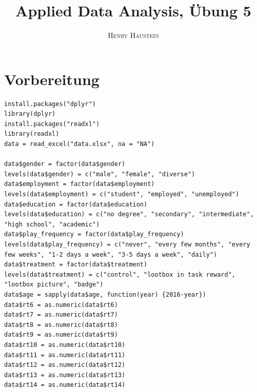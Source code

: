 \documentclass{article}
\title{\textbf{Applied Data Analysis, Übung 5}}
\author{\textsc{Henry Haustein}}
\date{}
\begin{document}
	\maketitle
	
	\section*{Vorbereitung}
	\begin{lstlisting}
install.packages("dplyr")
library(dplyr)
install.packages("readxl")
library(readxl)
data = read_excel("data.xlsx", na = "NA")

data$gender = factor(data$gender)
levels(data$gender) = c("male", "female", "diverse")
data$employment = factor(data$employment)
levels(data$employment) = c("student", "employed", "unemployed")
data$education = factor(data$education)
levels(data$education) = c("no degree", "secondary", "intermediate", "high school", "academic")
data$play_frequency = factor(data$play_frequency)
levels(data$play_frequency) = c("never", "every few months", "every few weeks", "1-2 days a week", "3-5 days a week", "daily")
data$treatment = factor(data$treatment)
levels(data$treatment) = c("control", "lootbox in task reward", "lootbox picture", "badge")
data$age = sapply(data$age, function(year) {2016-year})
data$rt6 = as.numeric(data$rt6)
data$rt7 = as.numeric(data$rt7)
data$rt8 = as.numeric(data$rt8)
data$rt9 = as.numeric(data$rt9)
data$rt10 = as.numeric(data$rt10)
data$rt11 = as.numeric(data$rt11)
data$rt12 = as.numeric(data$rt12)
data$rt13 = as.numeric(data$rt13)
data$rt14 = as.numeric(data$rt14)
	\end{lstlisting}
	
\end{document}
